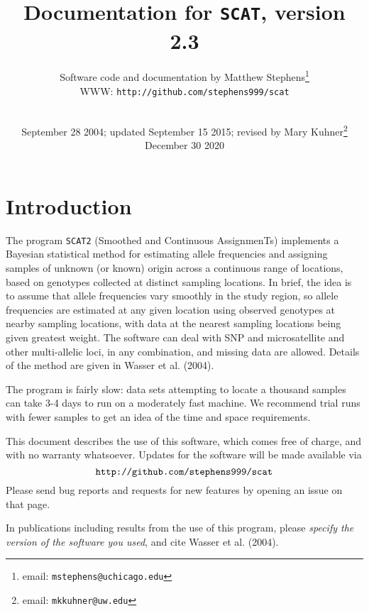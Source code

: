 \documentclass[10pt,titlepage,times,letterpaper]{article}
\def\SCAT{{\tt SCAT2} }
\begin{document}
\title{Documentation for {\tt SCAT}, version 2.3}

\author{
Software code and documentation by Matthew Stephens\footnote{email: {\tt mstephens@uchicago.edu}} \\
WWW: {\tt http://github.com/stephens999/scat}\\
\\
}

\date{September 28 2004; updated September 15 2015; revised by Mary Kuhner\footnote{email:  {\tt mkkuhner@uw.edu}} December 30 2020}


\maketitle

\tableofcontents
\vfil\eject
\section{Introduction}

The program \SCAT (Smoothed and Continuous AssignmenTs)
implements a Bayesian statistical method for estimating allele
frequencies and assigning samples of unknown (or known) origin across
a continuous range of locations, based on genotypes collected at
distinct sampling locations.  In brief, the idea is to assume that allele
frequencies vary smoothly in the study region, so allele frequencies
are estimated at any given location using observed genotypes at
nearby sampling locations, with data at the nearest sampling
locations being given greatest weight.  The software can deal with SNP
and microsatellite and other multi-allelic loci, in any combination,
and missing data are allowed. Details of the method are given in
Wasser et al. (2004).

The program is fairly slow:  data sets attempting to locate a thousand
samples can take 3-4 days to run on a moderately fast machine.  We
recommend trial runs with fewer samples to get an idea of the time and
space requirements.

This document describes the use of this software, which comes free of
charge, and with no warranty whatsoever.  Updates for the software
will be made available via
$$\text{{\tt http://github.com/stephens999/scat}}$$
Please send bug reports and requests for new features by opening an issue on that page.

In publications including results from the use of this program, please
{\it specify the version of the software you used}, and cite
Wasser et al. (2004).
\end{document}
